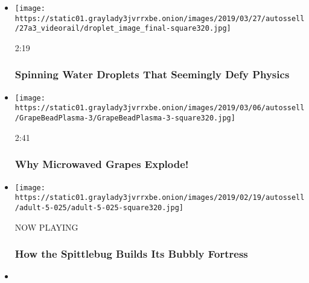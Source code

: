 \begin{itemize}
\item
  \href{https://www.nytimes3xbfgragh.onion/video/science/100000006415939/spinning-water-droplets-that-defy-physics.html?action=click\&module=video-series-bar\&region=header\&pgtype=Article\&playlistId=video/sciencetake}{}

  \texttt{[image: https://static01.graylady3jvrrxbe.onion/images/2019/03/27/autossell/27a3\_videorail/droplet\_image\_final-square320.jpg]}

  2:19

  \hypertarget{spinning-water-droplets-that-seemingly-defy-physics}{%
  \subsubsection{Spinning Water Droplets That Seemingly Defy
  Physics}\label{spinning-water-droplets-that-seemingly-defy-physics}}
\item
  \href{https://www.nytimes3xbfgragh.onion/video/science/100000006374883/why-microwaved-grapes-explode.html?action=click\&module=video-series-bar\&region=header\&pgtype=Article\&playlistId=video/sciencetake}{}

  \texttt{[image: https://static01.graylady3jvrrxbe.onion/images/2019/03/06/autossell/GrapeBeadPlasma-3/GrapeBeadPlasma-3-square320.jpg]}

  2:41

  \hypertarget{why-microwaved-grapes-explode}{%
  \subsubsection{Why Microwaved Grapes
  Explode!}\label{why-microwaved-grapes-explode}}
\item
  \texttt{[image: https://static01.graylady3jvrrxbe.onion/images/2019/02/19/autossell/adult-5-025/adult-5-025-square320.jpg]}

  NOW PLAYING

  \hypertarget{how-the-spittlebug-builds-its-bubbly-fortress-2}{%
  \subsubsection{How the Spittlebug Builds Its Bubbly
  Fortress}\label{how-the-spittlebug-builds-its-bubbly-fortress-2}}
\item
  \href{https://www.nytimes3xbfgragh.onion/video/science/100000006321699/how-the-hummingbird-bill-evolved-for-battle.html?action=click\&module=video-series-bar\&region=header\&pgtype=Article\&playlistId=video/sciencetake}{}


\end{itemize}
